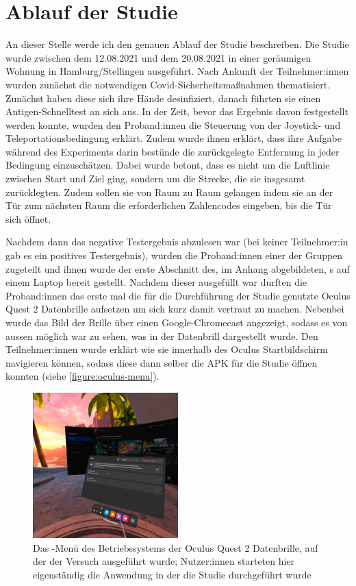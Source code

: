     \section{Ablauf der Studie}
        An dieser Stelle werde ich den genauen Ablauf der Studie beschreiben.
        Die Studie wurde zwischen dem 12.08.2021 und dem 20.08.2021 in einer geräumigen Wohnung in Hamburg/Stellingen ausgeführt. Nach Ankunft der Teilnehmer:innen wurden zunächst die notwendigen Covid-Sicherheitsmaßnahmen thematisiert.
        Zunächst haben diese sich ihre Hände desinfiziert, danach führten sie einen Antigen-Schnelltest an sich aus. In der Zeit, bevor das Ergebnis davon festgestellt werden konnte, wurden den Proband:innen die Steuerung von der Joystick- und Teleportationsbedingung erklärt.
        Zudem wurde ihnen erklärt, dass ihre Aufgabe während des Experiments darin bestünde die zurückgelegte Entfernung in jeder Bedingung einzuschätzen. Dabei wurde betont, dass es nicht um die Luftlinie zwischen Start und Ziel ging, sondern um die Strecke, die sie insgesamt zurücklegten. Zudem sollen sie von Raum zu Raum gelangen indem sie an der Tür zum nächsten Raum die erforderlichen Zahlencodes eingeben, bis die Tür sich öffnet.

        Nachdem dann das negative Testergebnis abzulesen war (bei keiner Teilnehmer:in gab es ein positives Testergebnis), wurden die Proband:innen einer der Gruppen zugeteilt und ihnen wurde der erste Abschnitt des, im Anhang
        abgebildeten, s auf einem Laptop bereit gestellt. Nachdem dieser ausgefüllt war durften die Proband:innen das erste mal die für die Durchführung der Studie genutzte Oculus Quest 2 Datenbrille aufsetzen um sich kurz damit vertraut zu machen. Nebenbei wurde das Bild der Brille über einen Google-Chromecast angezeigt, sodass es von aussen möglich war zu sehen, was in der Datenbrill dargestellt wurde. Den Teilnehmer:innen wurde erklärt wie sie innerhalb des Oculus Startbildschirm navigieren können, sodass diese dann selber die APK für die Studie öffnen konnten (siehe \autoref{figure:oculus-menu}).

        \begin{figure}[!h]
            \centering
            \includegraphics[width=0.5\textwidth]{vrscreenshots/oculusmenu.jpg}
            \caption{Das -Menü des Betriebssystems der Oculus Quest 2 Datenbrille, auf der der Versuch ausgeführt wurde; Nutzer:innen starteten hier eigenständig die Anwendung in der die Studie durchgeführt wurde}\label{figure:oculus-menu}
        \end{figure}

